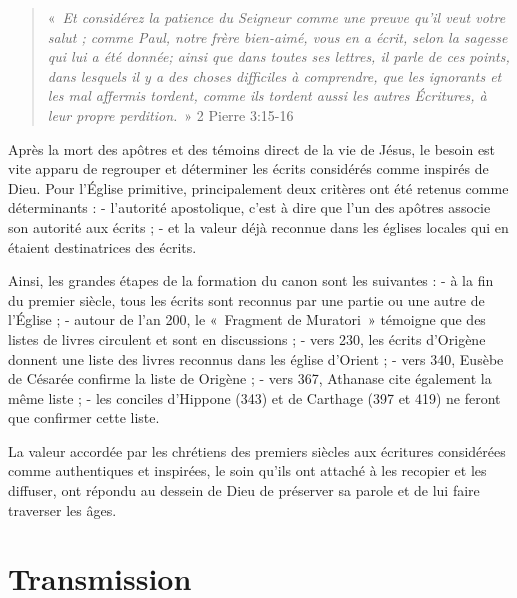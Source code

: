 \begin{small}
\begin{quote}
«~\emph{Et considérez la patience du Seigneur comme une preuve qu'il veut votre salut ; comme Paul, notre frère bien-aimé, vous en a écrit, selon la sagesse qui lui a été donnée; ainsi que dans toutes ses lettres, il parle de ces points, dans lesquels il y a des choses difficiles à comprendre, que les ignorants et les mal affermis tordent, comme ils tordent aussi les autres Écritures, à leur propre perdition.}~» 2 Pierre 3:15-16
\end{quote}

Après la mort des apôtres et des témoins direct de la vie de Jésus, le besoin est vite apparu de regrouper et déterminer les écrits considérés comme inspirés de Dieu. Pour l'Église primitive, principalement deux critères ont été retenus comme déterminants :\newline
- l'autorité apostolique, c'est à dire que l'un des apôtres associe son autorité aux écrits ;\newline
- et la valeur déjà reconnue dans les églises locales qui en étaient destinatrices des écrits.\bigskip

Ainsi, les grandes étapes de la formation du canon sont les suivantes :\newline
- à la fin du premier siècle, tous les écrits sont reconnus par une partie ou une autre de l'Église ;\newline
- autour de l'an 200, le «~Fragment de Muratori~» témoigne que des listes de livres circulent et sont en discussions ;\newline
- vers 230, les écrits d'Origène donnent une liste des livres reconnus dans les église d'Orient ;\newline
- vers 340, Eusèbe de Césarée confirme la liste de Origène ;\newline
- vers 367, Athanase cite également la même liste ;\newline
- les conciles d'Hippone (343) et de Carthage (397 et 419) ne feront que confirmer cette liste.\bigskip

La valeur accordée par les chrétiens des premiers siècles aux écritures considérées comme authentiques et inspirées, le soin qu'ils ont attaché à les recopier et les diffuser, ont répondu au dessein de Dieu de préserver sa parole et de lui faire traverser les âges.

\section*{Transmission}


\end{small}
